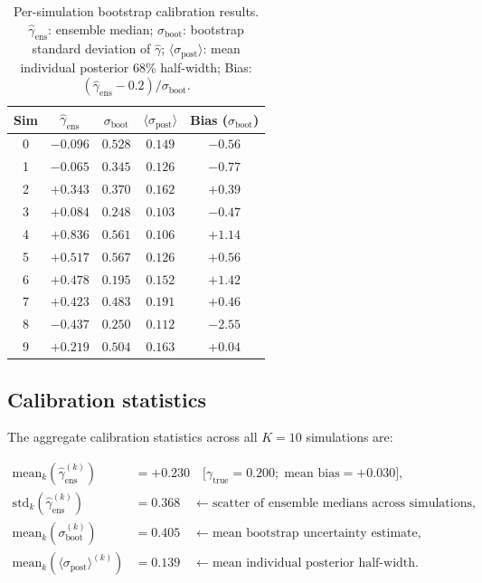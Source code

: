 \documentclass[11pt,a4paper]{article}
\begin{document}
\begin{table}[htbp]
  \centering
  \caption{Per-simulation bootstrap calibration results.
  $\hat\gamma_\mathrm{ens}$: ensemble median;
  $\sigma_\mathrm{boot}$: bootstrap standard deviation of $\hat\gamma$;
  $\langle\sigma_\mathrm{post}\rangle$: mean individual posterior 68\% half-width;
  Bias: $(\hat\gamma_\mathrm{ens} - 0.2)/\sigma_\mathrm{boot}$.}
  \label{tab:results}
  \begin{tabular}{ccccc}
    \toprule
    Sim & $\hat\gamma_\mathrm{ens}$ & $\sigma_\mathrm{boot}$ &
    $\langle\sigma_\mathrm{post}\rangle$ & Bias ($\sigma_\mathrm{boot}$) \\
    \midrule
    0 & $-0.096$ & $0.528$ & $0.149$ & $-0.56$ \\
    1 & $-0.065$ & $0.345$ & $0.126$ & $-0.77$ \\
    2 & $+0.343$ & $0.370$ & $0.162$ & $+0.39$ \\
    3 & $+0.084$ & $0.248$ & $0.103$ & $-0.47$ \\
    4 & $+0.836$ & $0.561$ & $0.106$ & $+1.14$ \\
    5 & $+0.517$ & $0.567$ & $0.126$ & $+0.56$ \\
    6 & $+0.478$ & $0.195$ & $0.152$ & $+1.42$ \\
    7 & $+0.423$ & $0.483$ & $0.191$ & $+0.46$ \\
    8 & $-0.437$ & $0.250$ & $0.112$ & $-2.55$ \\
    9 & $+0.219$ & $0.504$ & $0.163$ & $+0.04$ \\
    \bottomrule
  \end{tabular}
\end{table}

\subsection{Calibration statistics}
\label{sec:calstats}

The aggregate calibration statistics across all $K = 10$ simulations are:

\begin{align}
  \mathrm{mean}_k\!\left(\hat\gamma_\mathrm{ens}^{(k)}\right)
  &= +0.230
  \quad\bigl[\gamma_\mathrm{true} = 0.200;\;\text{mean bias} = +0.030\bigr],
  \label{eq:mean_gamma}\\[4pt]
  \mathrm{std}_k\!\left(\hat\gamma_\mathrm{ens}^{(k)}\right)
  &= 0.368
  \quad\leftarrow\text{scatter of ensemble medians across simulations},
  \label{eq:std_gamma}\\[4pt]
  \mathrm{mean}_k\!\left(\sigma_\mathrm{boot}^{(k)}\right)
  &= 0.405
  \quad\leftarrow\text{mean bootstrap uncertainty estimate},
  \label{eq:mean_boot}\\[4pt]
  \mathrm{mean}_k\!\left(\langle\sigma_\mathrm{post}\rangle^{(k)}\right)
  &= 0.139
  \quad\leftarrow\text{mean individual posterior half-width}.
  \label{eq:mean_post}
\end{align}
\end{document}
